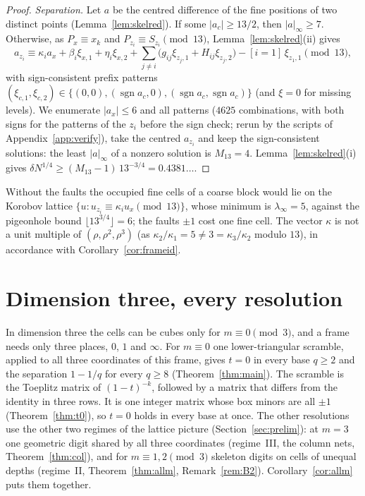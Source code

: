 \documentclass[11pt]{amsart}
\theoremstyle{definition}
\theoremstyle{plain}
\DeclareMathOperator{\sgn}{sgn}
\begin{document}
\begin{proof}
\emph{Separation.} Let $a$ be the centred difference of the fine positions of two distinct points (Lemma~\ref{lem:skelred}). If some $|a_c|\ge13/2$, then $|a|_\infty\ge7$. Otherwise, as $P_x\equiv x_k$ and $P_{z_i}\equiv S_{z_i}\pmod{13}$, Lemma~\ref{lem:skelred}(ii) gives
\[
a_{z_i}\equiv\kappa_ia_x+\beta_i\xi_{x,1}+\eta_i\xi_{x,2}+\sum_{j\ne i}\bigl(g_{ij}\xi_{z_j,1}+H_{ij}\xi_{z_j,2}\bigr)-[i=1]\,\xi_{z_1,1}\pmod{13},
\]
with sign-consistent prefix patterns $(\xi_{c,1},\xi_{c,2})\in\{(0,0),(\sgn a_c,0),(\sgn a_c,\sgn a_c)\}$ (and $\xi=0$ for missing levels). We enumerate $|a_x|\le6$ and all patterns ($4625$ combinations, with both signs for the patterns of the $z_i$ before the sign check; rerun by the scripts of Appendix~\ref{app:verify}), take the centred $a_{z_i}$ and keep the sign-consistent solutions: the least $|a|_\infty$ of a nonzero solution is $M_{13}=4$. Lemma~\ref{lem:skelred}(i) gives $\delta N^{1/4}\ge(M_{13}-1)\,13^{-3/4}=0.4381\ldots$.
\end{proof}

Without the faults the occupied fine cells of a coarse block would lie on the Korobov lattice $\{u:u_{z_i}\equiv\kappa_iu_x\pmod{13}\}$, whose minimum is $\lambda_\infty=5$, against the pigeonhole bound $\lfloor13^{3/4}\rfloor=6$; the faults $\pm1$ cost one fine cell. The vector $\kappa$ is not a unit multiple of $(\rho,\rho^2,\rho^3)$ (as $\kappa_2/\kappa_1=5\ne3=\kappa_3/\kappa_2$ modulo $13$), in accordance with Corollary~\ref{cor:frameid}.

\section{Dimension three, every resolution}\label{sec:dim3}
In dimension three the cells can be cubes only for $m\equiv0\pmod3$, and a frame needs only three places, $0$, $1$ and $\infty$. For $m\equiv0$ one lower-triangular scramble, applied to all three coordinates of this frame, gives $t=0$ in every base $q\ge2$ and the separation $1-1/q$ for every $q\ge8$ (Theorem~\ref{thm:main}). The scramble is the Toeplitz matrix of $(1-t)^{-k}$, followed by a matrix that differs from the identity in three rows. It is one integer matrix whose box minors are all $\pm1$ (Theorem~\ref{thm:t0}), so $t=0$ holds in every base at once. The other resolutions use the other two regimes of the lattice picture (Section~\ref{sec:prelim}): at $m=3$ one geometric digit shared by all three coordinates (regime~III, the column nets, Theorem~\ref{thm:col}), and for $m\equiv1,2\pmod3$ skeleton digits on cells of unequal depths (regime~II, Theorem~\ref{thm:allm}, Remark~\ref{rem:B2}). Corollary~\ref{cor:allm} puts them together.
\end{document}

